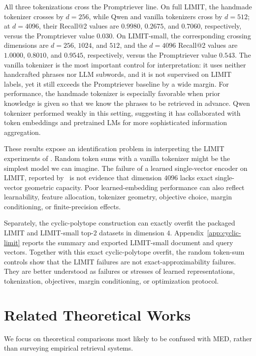 \documentclass{article}
\begin{document}
All three tokenizations cross the Promptriever line. On full LIMIT, the handmade tokenizer crosses by $d=256$, while Qwen and vanilla tokenizers cross by $d=512$; at $d=4096$, their Recall@2 values are $0.9980$, $0.2675$, and $0.7060$, respectively, versus the Promptriever value $0.030$. On LIMIT-small, the corresponding crossing dimensions are $d=256$, $1024$, and $512$, and the $d=4096$ Recall@2 values are $1.0000$, $0.8010$, and $0.9545$, respectively, versus the Promptriever value $0.543$. The vanilla tokenizer is the most important control for interpretation: it uses neither handcrafted phrases nor LLM subwords, and it is not supervised on LIMIT labels, yet it still exceeds the Promptriever baseline by a wide margin. For performance, the handmade tokenizer is especially favorable when prior knowledge is given so that we know the phrases to be retrieved in advance. Qwen tokenizer performed weakly in this setting, suggesting it has collaborated with token embeddings and pretrained LMs for more sophisticated information aggregation.

These results expose an identification problem in interpreting the LIMIT experiments of \citet{weller2025theoretical}. Random token sums with a vanilla tokenizer might be the simplest model we can imagine. The failure of a learned single-vector encoder on LIMIT, reported by~\citep{weller2025theoretical} is not evidence that dimension $4096$ lacks exact single-vector geometric capacity.  Poor learned-embedding performance can also reflect learnability, feature allocation, tokenizer geometry, objective choice, margin conditioning, or finite-precision effects.

Separately, the cyclic-polytope construction can exactly overfit the packaged LIMIT and LIMIT-small top-$2$ datasets in dimension $4$. Appendix~\ref{app:cyclic-limit} reports the summary and exported LIMIT-small document and query vectors. Together with this exact cyclic-polytope overfit, the random token-sum controls show that the LIMIT failures are not exact-approximability failures. They are better understood as failures or stresses of learned representations, tokenization, objectives, margin conditioning, or optimization protocol.
\section{Related Theoretical Works}\label{sec:related}

We focus on theoretical comparisons most likely to be confused with MED, rather than surveying empirical retrieval systems.
\end{document}
